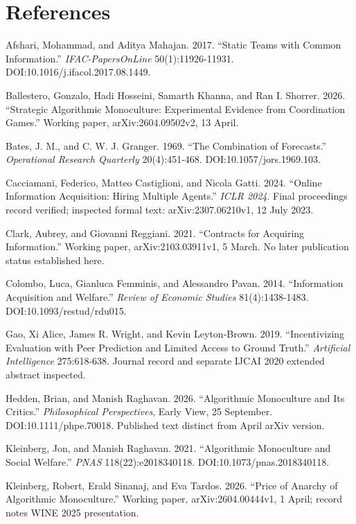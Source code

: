 \documentclass[
  11pt,
]{article}
\begin{document}
{
\small
\setlength{\parindent}{0pt}
\section*{References}\label{references}

\begingroup\small\setlength{\parskip}{3pt}

Afshari, Mohammad, and Aditya Mahajan. 2017. ``Static Teams with Common
Information.'' \emph{IFAC-PapersOnLine} 50(1):11926-11931.
DOI:10.1016/j.ifacol.2017.08.1449.

Ballestero, Gonzalo, Hadi Hosseini, Samarth Khanna, and Ran I. Shorrer.
2026. ``Strategic Algorithmic Monoculture: Experimental Evidence from
Coordination Games.'' Working paper, arXiv:2604.09502v2, 13 April.

Bates, J. M., and C. W. J. Granger. 1969. ``The Combination of
Forecasts.'' \emph{Operational Research Quarterly} 20(4):451-468.
DOI:10.1057/jors.1969.103.

Cacciamani, Federico, Matteo Castiglioni, and Nicola Gatti. 2024.
``Online Information Acquisition: Hiring Multiple Agents.'' \emph{ICLR
2024}. Final proceedings record verified; inspected formal text:
arXiv:2307.06210v1, 12 July 2023.

Clark, Aubrey, and Giovanni Reggiani. 2021. ``Contracts for Acquiring
Information.'' Working paper, arXiv:2103.03911v1, 5 March. No later
publication status established here.

Colombo, Luca, Gianluca Femminis, and Alessandro Pavan. 2014.
``Information Acquisition and Welfare.'' \emph{Review of Economic
Studies} 81(4):1438-1483. DOI:10.1093/restud/rdu015.

Gao, Xi Alice, James R. Wright, and Kevin Leyton-Brown. 2019.
``Incentivizing Evaluation with Peer Prediction and Limited Access to
Ground Truth.'' \emph{Artificial Intelligence} 275:618-638. Journal
record and separate IJCAI 2020 extended abstract inspected.

Hedden, Brian, and Manish Raghavan. 2026. ``Algorithmic Monoculture and
Its Critics.'' \emph{Philosophical Perspectives}, Early View, 25
September. DOI:10.1111/phpe.70018. Published text distinct from April
arXiv version.

Kleinberg, Jon, and Manish Raghavan. 2021. ``Algorithmic Monoculture and
Social Welfare.'' \emph{PNAS} 118(22):e2018340118.
DOI:10.1073/pnas.2018340118.

Kleinberg, Robert, Erald Sinanaj, and Eva Tardos. 2026. ``Price of
Anarchy of Algorithmic Monoculture.'' Working paper, arXiv:2604.00444v1,
1 April; record notes WINE 2025 presentation.

}
\end{document}
